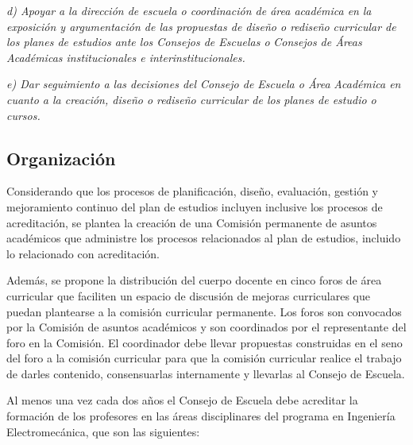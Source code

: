 \textit{d) Apoyar}\textit{ }\textit{a la dirección de escuela o coordinación de área académica en}\textit{ }\textit{la exposición y argumentación de las propuestas de diseño o rediseño}\textit{ }\textit{curricular de los planes de estudios ante los Consejos de Escuelas o}\textit{ }\textit{Consejos de Áreas Académicas institucionales e interinstitucionales.}\par

\textit{e) Dar seguimiento a las decisiones del Consejo de Escuela o Área}\textit{ }\textit{Académica en cuanto a la creación, diseño o rediseño curricular de los}\textit{ }\textit{planes de estudio o cursos.}\par

\subsection*{Organización}

Considerando que los procesos de planificación, diseño, evaluación, gestión y mejoramiento continuo del plan de estudios incluyen inclusive los procesos de acreditación, se plantea la creación de una Comisión permanente de asuntos académicos que administre los procesos relacionados al plan de estudios, incluido lo relacionado con acreditación.\par

Además, se propone la distribución del cuerpo docente en cinco foros de área curricular que faciliten un espacio de discusión de mejoras curriculares que puedan plantearse a la comisión curricular permanente. Los foros son convocados por la Comisión de asuntos académicos y son coordinados por el representante del foro en la Comisión. El coordinador debe llevar propuestas construidas en el seno del foro a la comisión curricular para que la comisión curricular realice el trabajo de darles contenido, consensuarlas internamente y llevarlas al Consejo de Escuela.\par

Al menos una vez cada dos años el Consejo de Escuela debe acreditar la formación de los profesores en las áreas disciplinares del programa en Ingeniería Electromecánica, que son las siguientes:\par

